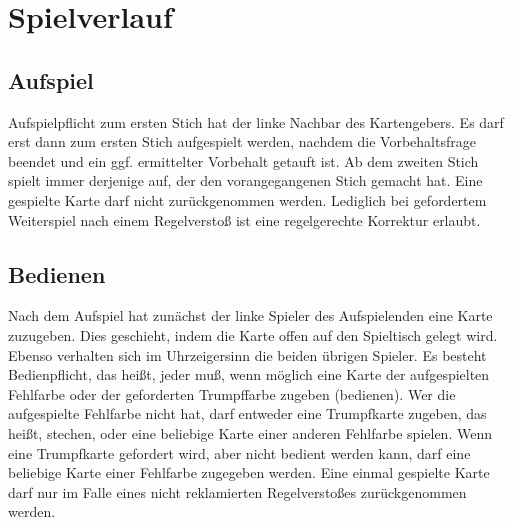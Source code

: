 \documentclass[12pt]{scrartcl}
\begin{document}
\section{Spielverlauf}

\subsection{Aufspiel}
Aufspielpflicht zum ersten Stich hat der linke Nachbar des
Kartengebers. Es darf erst dann zum ersten Stich aufgespielt
werden, nachdem die Vorbehaltsfrage beendet und ein ggf.
ermittelter Vorbehalt getauft ist. Ab dem zweiten Stich spielt
immer derjenige auf, der den vorangegangenen Stich gemacht hat.
Eine gespielte Karte darf nicht zurückgenommen werden. Lediglich
bei gefordertem Weiterspiel nach einem Regelverstoß ist eine
regelgerechte Korrektur erlaubt.

\subsection{Bedienen}
Nach dem Aufspiel hat zunächst der linke Spieler des
Aufspielenden eine Karte zuzugeben. Dies geschieht, indem die
Karte offen auf den Spieltisch gelegt wird. Ebenso verhalten sich
im Uhrzeigersinn die beiden übrigen Spieler. Es besteht
Bedienpflicht, das heißt, jeder muß, wenn möglich eine Karte
der aufgespielten Fehlfarbe oder der geforderten Trumpffarbe
zugeben (bedienen). Wer die aufgespielte Fehlfarbe nicht hat,
darf entweder eine Trumpfkarte zugeben, das heißt, stechen, oder
eine beliebige Karte einer anderen Fehlfarbe spielen. Wenn eine
Trumpfkarte gefordert wird, aber nicht bedient werden kann, darf
eine beliebige Karte einer Fehlfarbe zugegeben werden. Eine
einmal gespielte Karte darf nur im Falle eines nicht reklamierten
Regelverstoßes zurückgenommen werden.
\end{document}

